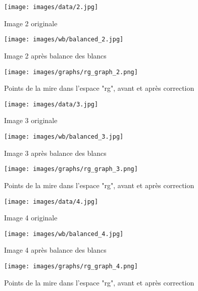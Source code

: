 \documentclass[12pt]{article}
\begin{document}
\begin{figure}[H]
    \centering
    \begin{minipage}{0.32\textwidth}
        \centering
        \texttt{[image: images/data/2.jpg]}
        \caption{Image 2 originale}
    \end{minipage}
    \hfill
    \begin{minipage}{0.32\textwidth}
        \centering
        \texttt{[image: images/wb/balanced\_2.jpg]}
        \caption{Image 2 après balance des blancs}
    \end{minipage}
    \begin{minipage}{0.32\textwidth}
        \centering
        \texttt{[image: images/graphs/rg\_graph\_2.png]}
        \caption{Points de la mire dans l'espace "rg", avant et après correction}
    \end{minipage}
\end{figure}

\begin{figure}[H]
    \centering
    \begin{minipage}{0.32\textwidth}
        \centering
        \texttt{[image: images/data/3.jpg]}
        \caption{Image 3 originale}
    \end{minipage}
    \hfill
    \begin{minipage}{0.32\textwidth}
        \centering
        \texttt{[image: images/wb/balanced\_3.jpg]}
        \caption{Image 3 après balance des blancs}
    \end{minipage}
    \begin{minipage}{0.32\textwidth}
        \centering
        \texttt{[image: images/graphs/rg\_graph\_3.png]}
        \caption{Points de la mire dans l'espace "rg", avant et après correction}
    \end{minipage}
\end{figure}

\begin{figure}[H]
    \centering
    \begin{minipage}{0.32\textwidth}
        \centering
        \texttt{[image: images/data/4.jpg]}
        \caption{Image 4 originale}
    \end{minipage}
    \hfill
    \begin{minipage}{0.32\textwidth}
        \centering
        \texttt{[image: images/wb/balanced\_4.jpg]}
        \caption{Image 4 après balance des blancs}
    \end{minipage}
    \begin{minipage}{0.32\textwidth}
        \centering
        \texttt{[image: images/graphs/rg\_graph\_4.png]}
        \caption{Points de la mire dans l'espace "rg", avant et après correction}
    \end{minipage}
\end{figure}
\end{document}
